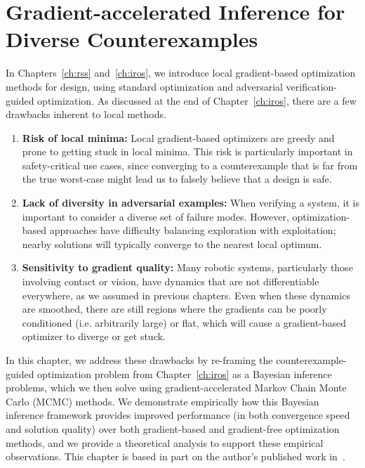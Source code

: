 \chapter{Gradient-accelerated Inference for Diverse Counterexamples}\label{ch:corl}

In Chapters~\ref{ch:rss} and~\ref{ch:iros}, we introduce local gradient-based optimization methods for design, using standard optimization and adversarial verification-guided optimization. As discussed at the end of Chapter~\ref{ch:iros}, there are a few drawbacks inherent to local methods.

\begin{enumerate}
    \item \textbf{Risk of local minima: } Local gradient-based optimizers are greedy and prone to getting stuck in local minima. This risk is particularly important in safety-critical use cases, since converging to a counterexample that is far from the true worst-case might lead us to falsely believe that a design is safe.
    \item \textbf{Lack of diversity in adversarial examples: } When verifying a system, it is important to consider a diverse set of failure modes. However, optimization-based approaches have difficulty balancing exploration with exploitation; nearby solutions will typically converge to the nearest local optimum.
    \item \textbf{Sensitivity to gradient quality: } Many robotic systems, particularly those involving contact or vision, have dynamics that are not differentiable everywhere, as we assumed in previous chapters. Even when these dynamics are smoothed, there are still regions where the gradients can be poorly conditioned (i.e. arbitrarily large) or flat, which will cause a gradient-based optimizer to diverge or get stuck.
\end{enumerate}

In this chapter, we address these drawbacks by re-framing the counterexample-guided optimization problem from Chapter~\ref{ch:iros} as a Bayesian inference problems, which we then solve using gradient-accelerated Markov Chain Monte Carlo (MCMC) methods. We demonstrate empirically how this Bayesian inference framework provides improved performance (in both convergence speed and solution quality) over both gradient-based and gradient-free optimization methods, and we provide a theoretical analysis to support these empirical observations. This chapter is based in part on the author's published work in~\cite{dawsonBayesianApproachBreaking2023}.

